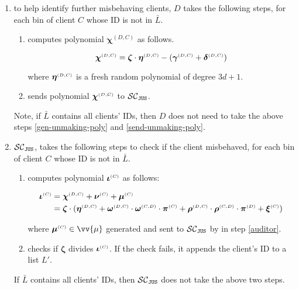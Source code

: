 \begin{enumerate}
\begin{enumerate}
 
 \item to  help identify further  misbehaving clients, $D$ takes the following steps,  for each bin of client $    {  C}$ whose ID is not in $\bar L$.   
 \begin{enumerate}
 \item\label{gen-unmaking-poly} computes polynomial $\bm\chi^{  {  {(D, C)}}}$ as follows. 
 
 $$\bm\chi^{ \scriptscriptstyle {  {(D, C)}}}=\bm\zeta\cdot \bm\eta^{ \scriptscriptstyle {  {(D,C)}}}-(\bm\gamma^{ \scriptscriptstyle {  {(D,C)}}}+\bm\delta^{ \scriptscriptstyle {  {(D,C)}}})$$
 
 
  where $\bm\eta^{ \scriptscriptstyle {  {(D,C)}}}$ is a fresh random polynomial of degree $3d+1$. 
  
  \item\label{send-unmaking-poly} sends  polynomial $\bm\chi^{ \scriptscriptstyle {  {(D, C)}}}$ to  $\mathcal{SC}_{\mathtt{JUS}}$. 
  

 \end{enumerate}
  Note, if $\bar L$ contains all clients' IDs, then $D$ does not need to take the above steps \ref{gen-unmaking-poly} and \ref{send-unmaking-poly}. 
 
 \item  $\mathcal{SC}_{\mathtt{JUS}}$,   takes the following steps to check if the client misbehaved,  for each bin of client $    {  C}$ whose ID is not in $\bar L$.
 
 
  \begin{enumerate}
  
 \item computes  polynomial $\bm\iota^{\scriptscriptstyle  {  {(C)}}}$ as follows: 
 
  \begin{equation*}
\begin{split}
 \bm\iota^{ \scriptscriptstyle {  {(C)}}}&=\bm\chi^{\scriptscriptstyle  {  {(D, C)}}}+\bm\nu^{\scriptscriptstyle  {  {(C)}}} +\bm\mu^{ \scriptscriptstyle {  {(C)}}} \\ 
 &=\bm\zeta\cdot(\bm\eta^{ \scriptscriptstyle {  {(D,C)}}} + \bm\omega^{ \scriptscriptstyle {  {(D,C)}}}\cdot \bm\omega^{ \scriptscriptstyle {  {(C,D)}}}\cdot \bm\pi^{ \scriptscriptstyle {  {(C)}}}+\bm\rho^{ \scriptscriptstyle {  {(D,C)}}}\cdot \bm\rho^{ \scriptscriptstyle {  {(C,D)}}}\cdot \bm\pi^{ \scriptscriptstyle {  {(D)}}}+\bm\xi^{ \scriptscriptstyle {  {(C)}}})
 \end{split}
\end{equation*}

 where $\bm\mu^{ \st {  {(C)}}} \in \vv{\mu}$ generated and sent to $\mathcal{SC}_{\mathtt{JUS}}$  by \aud in step \ref{auditor}.   
  \item checks if $\bm\zeta$  divides $\bm\iota^{ \scriptscriptstyle {  {(C)}}}$. If the check fails, it appends the client's ID to  a list $ L'$.
  \end{enumerate}
   If $\bar L$ contains all clients' IDs, then $\mathcal{SC}_{\mathtt{JUS}}$ does not take the above two steps. 


\end{enumerate}
\end{enumerate}
